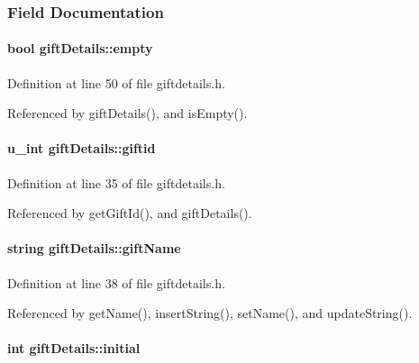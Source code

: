 \subsubsection{Field Documentation}
\hypertarget{classgiftDetails_giftDetailso5}{
\paragraph[empty]{\setlength{\rightskip}{0pt plus 5cm}bool gift\-Details::empty}\hfill}
\label{classgiftDetails_giftDetailso5}




Definition at line 50 of file giftdetails.h.

Referenced by gift\-Details(), and is\-Empty().\hypertarget{classgiftDetails_giftDetailso0}{
\paragraph[giftid]{\setlength{\rightskip}{0pt plus 5cm}u\_\-int gift\-Details::giftid}\hfill}
\label{classgiftDetails_giftDetailso0}




Definition at line 35 of file giftdetails.h.

Referenced by get\-Gift\-Id(), and gift\-Details().\hypertarget{classgiftDetails_giftDetailso1}{
\paragraph[giftName]{\setlength{\rightskip}{0pt plus 5cm}string gift\-Details::gift\-Name}\hfill}
\label{classgiftDetails_giftDetailso1}




Definition at line 38 of file giftdetails.h.

Referenced by get\-Name(), insert\-String(), set\-Name(), and update\-String().\hypertarget{classgiftDetails_giftDetailso3}{
\paragraph[initial]{\setlength{\rightskip}{0pt plus 5cm}int gift\-Details::initial}\hfill}
\label{classgiftDetails_giftDetailso3}




